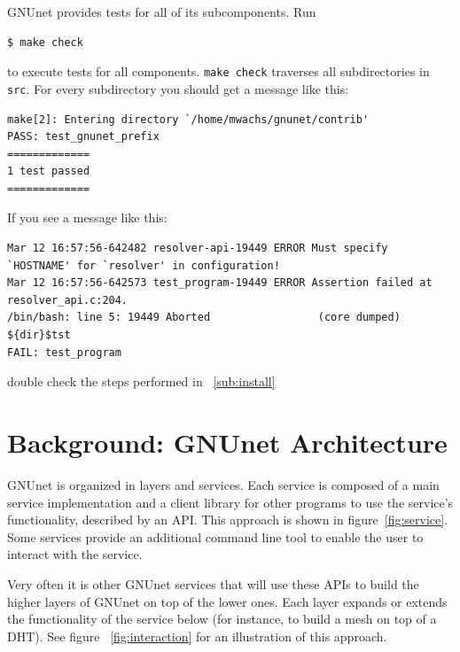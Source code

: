 \documentclass[10pt]{article}
\begin{document}
GNUnet provides tests for all of its subcomponents. Run
\begin{lstlisting}
$ make check
\end{lstlisting}
to execute tests for all components. {\tt make check} traverses all subdirectories in {\tt src}.
For every subdirectory you should get a message like this:

\begin{lstlisting}
make[2]: Entering directory `/home/mwachs/gnunet/contrib'
PASS: test_gnunet_prefix
=============
1 test passed
=============
\end{lstlisting}

If you see a message like this:

\begin{lstlisting}
Mar 12 16:57:56-642482 resolver-api-19449 ERROR Must specify `HOSTNAME' for `resolver' in configuration!
Mar 12 16:57:56-642573 test_program-19449 ERROR Assertion failed at resolver_api.c:204.
/bin/bash: line 5: 19449 Aborted                 (core dumped) ${dir}$tst
FAIL: test_program
\end{lstlisting}
double check the steps performed in ~\ref{sub:install}

\section{Background: GNUnet Architecture}
GNUnet is organized in layers and services. Each service is composed of a
main service implementation and a client library for other programs to use
the service's functionality, described by an API. This approach is shown in
figure~\ref{fig:service}. Some services provide an additional command line
tool to enable the user to interact with the service.

Very often it is other GNUnet services that will use these APIs to build the
higher layers of GNUnet on top of the lower ones. Each layer expands or extends
the functionality of the service below (for instance, to build a mesh on top of
a DHT). See figure ~\ref{fig:interaction} for an illustration of this approach.
\end{document}
